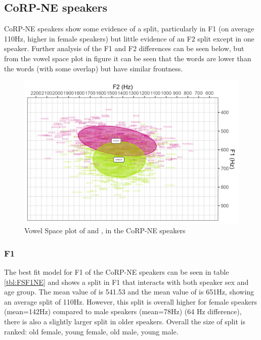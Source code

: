 \documentclass[../../../00.FullDoc/tex/ThesisSkeleton-draft2]{subfiles}
\begin{document}
\subsection{CoRP-NE speakers} \label{subsec:FSNE}
CoRP-NE speakers show some evidence of a \FS{} split, particularly in F1 (on average 110Hz, higher in female speakers) but little evidence of an F2 split except in one speaker. Further analysis of the F1 and F2 differences can be seen below, but from the vowel space plot in figure it can be seen that the \strutt{} words are lower than the \foot{} words (with some overlap) but have similar frontness.

\begin{figure}[h]
	\includegraphics[width=\textwidth]{../figures/FS-NE-vplot.png}
	\caption{Vowel Space plot of \foot{} and \strutt{}, in the CoRP-NE speakers} \label{fig:FSvplotNE}
\end{figure}


\subsubsection{F1} \label{subsubsec:NEF1}

The best fit model for F1 of the CoRP-NE speakers can be seen in table \ref{tbl:FSF1NE} and shows a \FS{} split in F1 that interacts with both speaker sex and age group. The mean value of \foot{} is 541.53 and the mean value of \strutt{} is 651Hz, showing an average split of 110Hz. However, this split is overall higher for female speakers (mean=142Hz) compared to male speakers (mean=78Hz) (64 Hz difference), there is also a slightly larger split in older speakers. Overall the size of split is ranked: old female, young female, old male, young male.
\end{document}

